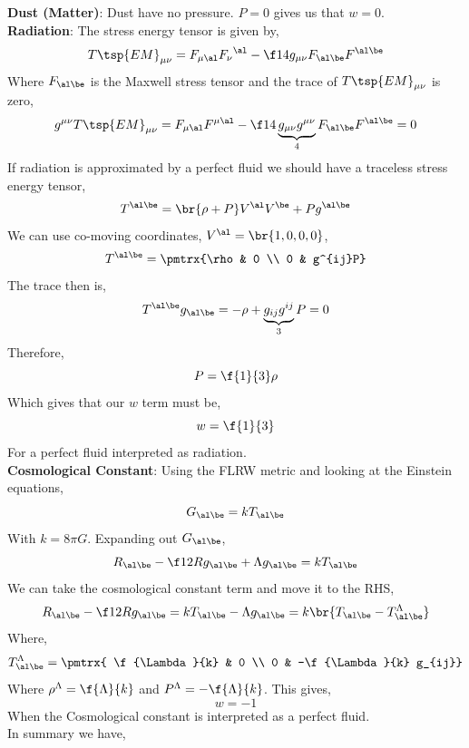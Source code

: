 \documentclass{article}
\begin{document}
\textbf{Dust (Matter)}: Dust have no pressure. $P= 0$ gives us that $w = 0$.\\

\textbf{Radiation}: The stress energy tensor is given by,
\[ T\tsp{EM}_{\mu\nu} = F_{\mu\al}{F_{\nu}}^{\al} - \f14 g_{\mu\nu} F_{\al\be} F^{\al\be} \]
Where $F_{\al\be}$ is the Maxwell stress tensor and the trace of ${T\tsp{EM}}_{\mu\nu}$ is zero,
\[ g^{\mu\nu}T\tsp{EM}_{\mu\nu} = F_{\mu\al}F^{\mu\al} - \f14 \underbrace{g_{\mu\nu}g^{\mu\nu}}_{4} F_{\al\be} F^{\al\be} = 0 \]
If radiation is approximated by a perfect fluid we should have a traceless stress energy tensor,
\[ T^{\al\be} = \br{\rho + P}V^\al V^\be + P g^{\al\be} \]
We can use co-moving coordinates, $V^\al = \br{1, 0, 0, 0}$,
\[ T^{\al\be} = \pmtrx{\rho & 0 \\ 0 & g^{ij}P} \]
The trace then is,
\[ T^{\al\be}g_{\al\be} = -\rho + \underbrace{g_{ij}g^{ij}}_{3}P = 0 \]
Therefore,
\[ P = \f{1}{3} \rho \]
Which gives that our $w$ term must be,
\[ w = \f{1}{3} \]
For a perfect fluid interpreted as radiation. \\

\textbf{Cosmological Constant}:
Using the FLRW metric and looking at the Einstein equations,
\[ G_{\al\be} = k T_{\al\be} \]
With $k = 8\pi G$. Expanding out $G_{\al\be}$,
\[ R_{\al\be} - \f12 R g_{\al\be} + \Lambda g_{\al\be} = k T_{\al\be} \]
We can take the cosmological constant term and move it to the RHS,
\[ R_{\al\be} - \f12 R g_{\al\be} = k T_{\al\be} - \Lambda g_{\al\be} = k \br{T_{\al\be} - T^{\Lambda}_{\al\be}} \]
Where,
\[ T^{\Lambda}_{\al\be} = \pmtrx{ \f{\Lambda}{k} & 0 \\ 0 & -\f{\Lambda}{k} g_{ij}} \]
Where $\rho^{\Lambda} = \f{\Lambda}{k}$ and $P^{\Lambda} = -\f{\Lambda}{k}$. This gives,
\[ w = -1 \]
When the Cosmological constant is interpreted as a perfect fluid.\\

In summary we have,
\end{document}

